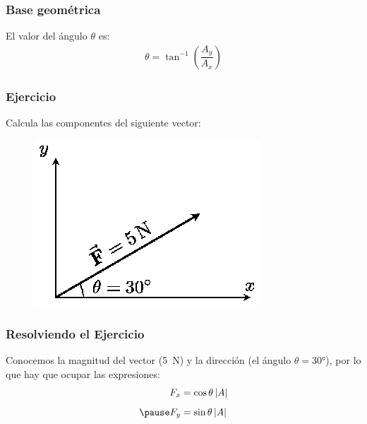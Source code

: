 \documentclass[14pt]{beamer}
\begin{document}
\begin{frame}
\frametitle{Base geométrica}
\begin{figure}
    \centering
\end{figure}
El valor del ángulo $\theta$ es:
\pause
\begin{align*}
\theta = \tan^{-1} \left( \dfrac{A_y}{A_{x}} \right)
\end{align*}
\end{frame}
\begin{frame}
\frametitle{Ejercicio}
Calcula las componentes del siguiente vector:
\pause
\begin{figure}
    \centering
    \includegraphics[scale=1.2]{Imagenes/Componentes_Vector_04.eps}
\end{figure}
\end{frame}
\begin{frame}
\frametitle{Resolviendo el Ejercicio}
Conocemos la magnitud del vector (\SI{5}{\newton}) y la dirección (el ángulo $\theta = \ang{30}$), por lo que hay que ocupar las expresiones:
\pause
\begin{eqnarray*}
\begin{aligned}
F_{x} &= \cos \theta \, \abs{A} \\[0.5em] \pause
F_{y} &= \sin \theta \, \abs{A}    
\end{aligned}
\end{eqnarray*}
\end{frame}
\end{document}
